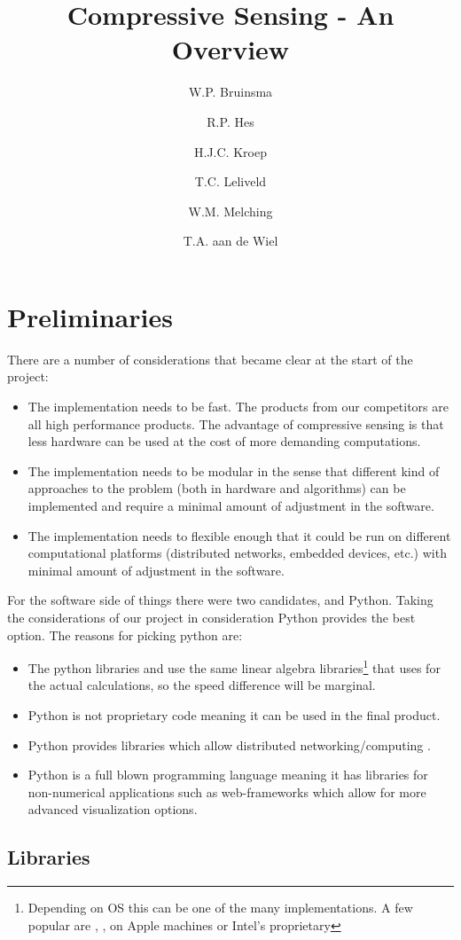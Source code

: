 \documentclass[a4paper, openany, oneside]{memoir}
\title{Compressive Sensing - An Overview}
\author{W.P. Bruinsma \and R.P. Hes \and H.J.C. Kroep \and T.C. Leliveld \and W.M. Melching \and T.A. aan de Wiel}
\begin{document}
\chapter{Preliminaries}
There are a number of considerations that became clear at the start of the project:
\begin{itemize}
    \item The implementation needs to be fast. The products from our competitors are all high performance products. The advantage of compressive sensing is that less hardware can be used at the cost of more demanding computations.
    \item The implementation needs to be modular in the sense that different kind of approaches to the problem (both in hardware and algorithms) can be implemented and require a minimal amount of adjustment in the software.
    \item The implementation needs to flexible enough that it could be run on different computational platforms (distributed networks, embedded devices, etc.) with minimal amount of adjustment in the software.
\end{itemize}
For the software side of things there were two candidates, \matlab{} and Python. Taking the considerations of our project in consideration Python provides the best option. The reasons for picking python are:
\begin{itemize}
    \item The python libraries  and  use the same linear algebra libraries\footnote{Depending on OS this can be one of the many implementations. A few popular are , ,  on Apple machines or Intel's proprietary } that \matlab{} uses for the actual calculations, so the speed difference will be marginal.
    \item Python is not proprietary code meaning it can be used in the final product.
    \item Python provides libraries which allow distributed networking/computing \cite{pythonmp}.
    \item Python is a full blown programming language meaning it has libraries for non-numerical applications such as web-frameworks which allow for more advanced visualization options.
\end{itemize}

\section{Libraries}
\label{sec:libraries}
\end{document}
